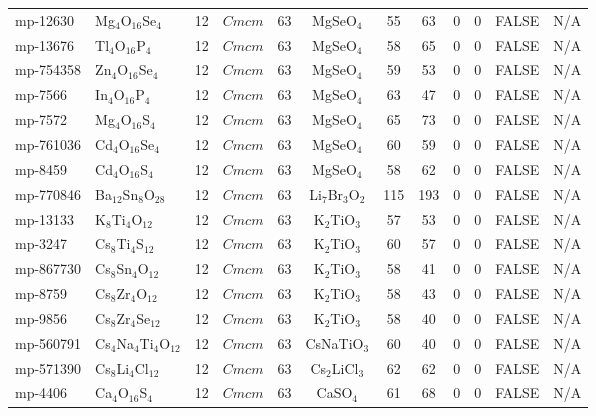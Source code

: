 {\begin{longtable}{llcccccccccc}
    mp-12630 & Mg$_{4}$O$_{16}$Se$_{4}$ & 12    & $Cmcm$ & 63    & MgSeO$_{4}$ & 55    & 63    & 0     & 0     & FALSE & N/A \\
    mp-13676 & Tl$_{4}$O$_{16}$P$_{4}$ & 12    & $Cmcm$ & 63    & MgSeO$_{4}$ & 58    & 65    & 0     & 0     & FALSE & N/A \\
    mp-754358 & Zn$_{4}$O$_{16}$Se$_{4}$ & 12    & $Cmcm$ & 63    & MgSeO$_{4}$ & 59    & 53    & 0     & 0     & FALSE & N/A \\
    mp-7566 & In$_{4}$O$_{16}$P$_{4}$ & 12    & $Cmcm$ & 63    & MgSeO$_{4}$ & 63    & 47    & 0     & 0     & FALSE & N/A \\
    mp-7572 & Mg$_{4}$O$_{16}$S$_{4}$ & 12    & $Cmcm$ & 63    & MgSeO$_{4}$ & 65    & 73    & 0     & 0     & FALSE & N/A \\
    mp-761036 & Cd$_{4}$O$_{16}$Se$_{4}$ & 12    & $Cmcm$ & 63    & MgSeO$_{4}$ & 60    & 59    & 0     & 0     & FALSE & N/A \\
    mp-8459 & Cd$_{4}$O$_{16}$S$_{4}$ & 12    & $Cmcm$ & 63    & MgSeO$_{4}$ & 58    & 62    & 0     & 0     & FALSE & N/A \\
    mp-770846 & Ba$_{12}$Sn$_{8}$O$_{28}$ & 12    & $Cmcm$ & 63    & Li$_{7}$Br$_{3}$O$_{2}$ & 115   & 193   & 0     & 0     & FALSE & N/A \\
    mp-13133 & K$_{8}$Ti$_{4}$O$_{12}$ & 12    & $Cmcm$ & 63    & K$_{2}$TiO$_{3}$ & 57    & 53    & 0     & 0     & FALSE & N/A \\
    mp-3247 & Cs$_{8}$Ti$_{4}$S$_{12}$ & 12    & $Cmcm$ & 63    & K$_{2}$TiO$_{3}$ & 60    & 57    & 0     & 0     & FALSE & N/A \\
    mp-867730 & Cs$_{8}$Sn$_{4}$O$_{12}$ & 12    & $Cmcm$ & 63    & K$_{2}$TiO$_{3}$ & 58    & 41    & 0     & 0     & FALSE & N/A \\
    mp-8759 & Cs$_{8}$Zr$_{4}$O$_{12}$ & 12    & $Cmcm$ & 63    & K$_{2}$TiO$_{3}$ & 58    & 43    & 0     & 0     & FALSE & N/A \\
    mp-9856 & Cs$_{8}$Zr$_{4}$Se$_{12}$ & 12    & $Cmcm$ & 63    & K$_{2}$TiO$_{3}$ & 58    & 40    & 0     & 0     & FALSE & N/A \\
    mp-560791 & Cs$_{4}$Na$_{4}$Ti$_{4}$O$_{12}$ & 12    & $Cmcm$ & 63    & CsNaTiO$_{3}$ & 60    & 40    & 0     & 0     & FALSE & N/A \\
    mp-571390 & Cs$_{8}$Li$_{4}$Cl$_{12}$ & 12    & $Cmcm$ & 63    & Cs$_{2}$LiCl$_{3}$ & 62    & 62    & 0     & 0     & FALSE & N/A \\
    mp-4406 & Ca$_{4}$O$_{16}$S$_{4}$ & 12    & $Cmcm$ & 63    & CaSO$_{4}$ & 61    & 68    & 0     & 0     & FALSE & N/A \\

\end{longtable}}
